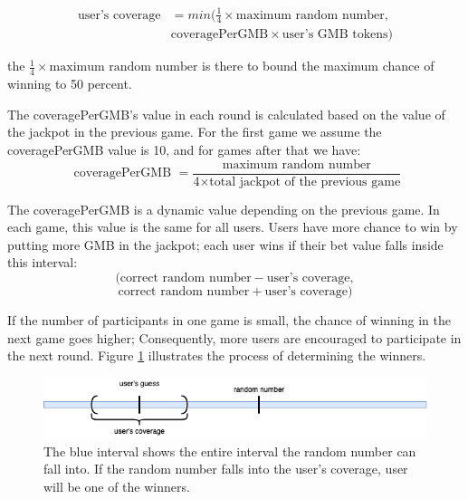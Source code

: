 \documentclass{article}
\begin{document}
\begin{align*}
    \text{user's coverage} &= min( \frac{1}{4} \times \text{maximum random number}, \\
    &\text{coveragePerGMB} \times \text{user's GMB tokens})
\end{align*}

the $\frac{1}{4} \times \text{maximum random number}$ is there to bound the maximum chance of winning to 50 percent.


The coveragePerGMB's value in each round is calculated based on the value of the jackpot in the previous game. For the first game we assume the coveragePerGMB value is 10, and for games after that we have:
$$
\text{ coveragePerGMB } = \frac{\text{maximum random number}}{\text{4}
\times \text{total jackpot of the previous game}}
$$


The coveragePerGMB is a dynamic value depending on the previous game. In each game, this value is the same for all users. Users have more chance to win by putting more GMB in the jackpot; each user wins if their bet value falls inside this interval:
$$
(\text{correct random number} - \text{user's coverage},$$
$$
\text{correct random number} + \text{user's coverage})
$$


If the number of participants in one game is small, the chance of winning in the next game goes higher; Consequently, more users are encouraged to participate in the next round. Figure \ref{fig:coverage} illustrates the process of determining the winners.


\begin{figure}
    \centering
    \includegraphics[width=\textwidth]{coverage.png}
    \caption{The blue interval shows the entire interval the random number can fall into. If the random number falls into the user's coverage, user will be one of the winners.}
    \label{fig:coverage}
\end{figure}
\end{document}
